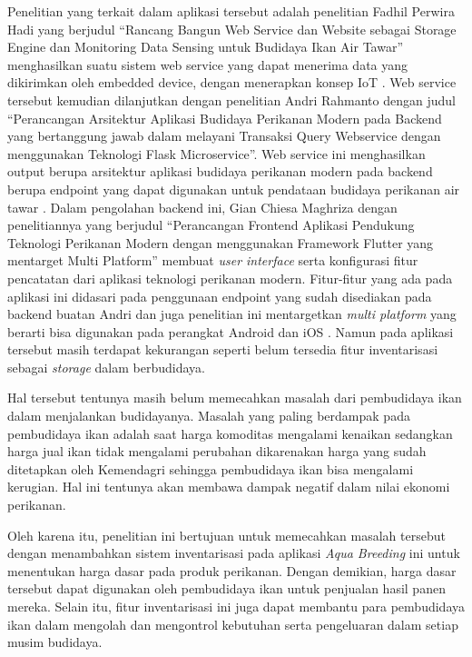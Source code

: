 Penelitian yang terkait dalam aplikasi tersebut adalah penelitian Fadhil Perwira Hadi yang berjudul “Rancang Bangun Web Service dan Website sebagai Storage Engine dan Monitoring Data Sensing untuk Budidaya Ikan Air Tawar” menghasilkan suatu sistem web service yang dapat menerima data yang dikirimkan oleh embedded device, dengan menerapkan konsep IoT \citep{fadhil2021}. Web service tersebut kemudian dilanjutkan dengan penelitian Andri Rahmanto dengan judul “Perancangan Arsitektur Aplikasi Budidaya Perikanan Modern pada Backend yang bertanggung jawab dalam melayani Transaksi Query Webservice dengan menggunakan Teknologi Flask Microservice”. Web service ini menghasilkan output berupa arsitektur aplikasi budidaya perikanan modern pada backend berupa endpoint yang dapat digunakan untuk pendataan budidaya perikanan air tawar \citep{andri2022}. Dalam pengolahan backend ini, Gian Chiesa Maghriza dengan penelitiannya yang berjudul “Perancangan Frontend Aplikasi Pendukung Teknologi Perikanan Modern dengan menggunakan Framework Flutter yang mentarget Multi Platform” membuat \textit{user interface} serta konfigurasi fitur pencatatan dari aplikasi teknologi perikanan modern. Fitur-fitur yang ada pada aplikasi ini didasari pada penggunaan endpoint yang sudah disediakan pada backend buatan Andri dan juga penelitian ini mentargetkan \textit{multi platform} yang berarti bisa digunakan pada perangkat Android dan iOS \citep{gian2022}. Namun pada aplikasi tersebut masih terdapat kekurangan seperti belum tersedia fitur inventarisasi sebagai \textit{storage} dalam berbudidaya.

Hal tersebut tentunya masih belum memecahkan masalah dari pembudidaya ikan dalam menjalankan budidayanya. Masalah yang paling berdampak pada pembudidaya ikan adalah saat harga komoditas mengalami kenaikan sedangkan harga jual ikan tidak mengalami perubahan dikarenakan harga yang sudah ditetapkan oleh Kemendagri sehingga pembudidaya ikan bisa mengalami kerugian. Hal ini tentunya akan membawa dampak negatif dalam nilai ekonomi perikanan.

Oleh karena itu, penelitian ini bertujuan untuk memecahkan masalah tersebut dengan menambahkan sistem inventarisasi pada aplikasi \textit{Aqua Breeding} ini untuk menentukan harga dasar pada produk perikanan. Dengan demikian, harga dasar tersebut dapat digunakan oleh pembudidaya ikan untuk penjualan hasil panen mereka. Selain itu, fitur inventarisasi ini juga dapat membantu para pembudidaya ikan dalam mengolah dan mengontrol kebutuhan serta pengeluaran dalam setiap musim budidaya.


